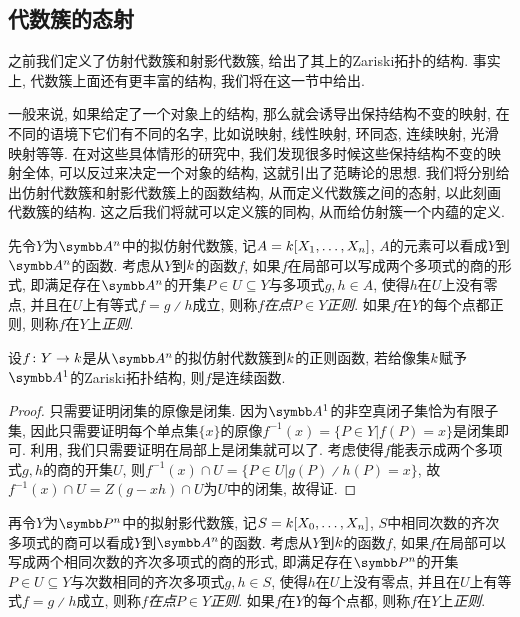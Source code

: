 \subsection{代数簇的态射}

之前我们定义了仿射代数簇和射影代数簇, 给出了其上的Zariski拓扑的结构. 事实上, 代数簇上面还有更丰富的结构, 我们将在这一节中给出.

一般来说, 如果给定了一个对象上的结构, 那么就会诱导出保持结构不变的映射, 在不同的语境下它们有不同的名字, 比如说映射, 线性映射, 环同态, 连续映射, 光滑映射等等. 在对这些具体情形的研究中, 我们发现很多时候这些保持结构不变的映射全体, 可以反过来决定一个对象的结构, 这就引出了范畴论的思想. 我们将分别给出仿射代数簇和射影代数簇上的函数结构, 从而定义代数簇之间的态射, 以此刻画代数簇的结构. 这之后我们将就可以定义簇的同构, 从而给仿射簇一个内蕴的定义.

\begin{definition}
  先令$Y$为$\AF^n$中的拟仿射代数簇, 记$A=k [X_1, \dotsc, X_n]$, $A$的元素可以看成$Y$到$\AF^n$的函数. 考虑从$Y$到$k$的函数$f$, 如果$f$在局部可以写成两个多项式的商的形式, 即满足存在$\AF^n$的开集$P\in U\subseteq Y$与多项式$g, h\in A$, 使得$h$在$U$上没有零点, 并且在$U$上有等式$f=g{\divslash}h$成立, 则称$f$\emph{在点$P\in Y$正则}. 如果$f$在$Y$的每个点都正则, 则称$f$在$Y$上\emph{正则}.
\end{definition}

\begin{proposition}\label{prop:affineregularcontinuous}
  设$f\colon Y\to k$是从$\AF^n$的拟仿射代数簇到$k$的正则函数, 若给像集$k$赋予$\AF^1$的Zariski拓扑结构, 则$f$是连续函数.
\end{proposition}

\begin{proof}
  只需要证明闭集的原像是闭集. 因为$\AF^1$的非空真闭子集恰为有限子集, 因此只需要证明每个单点集$\{x\}$的原像$f^{-1}(x)=\{P\in Y\vert f(P)=x\}$是闭集即可. 利用, 我们只需要证明在局部上是闭集就可以了. 考虑使得$f$能表示成两个多项式$g, h$的商的开集$U$, 则$f^{-1}(x)\cap U=\{P\in U\vert g(P){\divslash}h(P)=x\}$, 故$f^{-1}(x)\cap U=Z(g-xh)\cap U$为$U$中的闭集, 故得证.
\end{proof}

\begin{definition}
  再令$Y$为$\PP^n$中的拟射影代数簇, 记$S=k [X_0, \dotsc, X_n]$, $S$中相同次数的齐次多项式的商可以看成$Y$到$\AF^n$的函数. 考虑从$Y$到$k$的函数$f$, 如果$f$在局部可以写成两个相同次数的齐次多项式的商的形式, 即满足存在$\PP^n$的开集$P\in U\subseteq Y$与次数相同的齐次多项式$g, h\in S$, 使得$h$在$U$上没有零点, 并且在$U$上有等式$f=g{\divslash}h$成立, 则称$f$\emph{在点$P\in Y$正则}. 如果$f$在$Y$的每个点都, 则称$f$在$Y$上\emph{正则}.
\end{definition}

